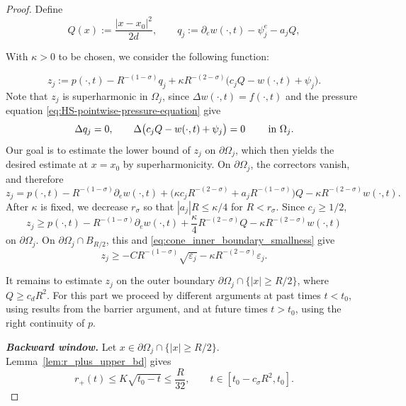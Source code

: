 \documentclass[11pt]{amsart}
\numberwithin{equation}{section}
\numberwithin{figure}{section}
\theoremstyle{plain}
\theoremstyle{definition}
\theoremstyle{remark}
\theoremstyle{plain}
\begin{document}
\begin{proof}
Define
\[
    Q(x):=\frac{|x-x_0|^2}{2d},
    \qquad
    q_j:=\partial_e w(\cdot,t)-\psi_j^e-a_jQ,
\]

With \(\kappa>0\) to be chosen,
we consider the following function:

\begin{equation}\label{eq:cone_barrier}
    z_j:=p(\cdot,t)-R^{-(1-\sigma)}q_j
    +\kappa R^{-(2-\sigma)}\bigl(c_jQ-w(\cdot,t)+\psi_j\bigr).
\end{equation}
Note that $z_j$ is superharmonic in $\Omega_j$, since  \(\Delta w(\cdot,t)=f(\cdot,t)\) and
the pressure equation \eqref{eq:HS-pointwise-pressure-equation}
give
\[
    \Delta q_j=0,
    \qquad
    \Delta\bigl(c_jQ-w(\cdot,t)+\psi_j\bigr)=0 \qquad \hbox{ in } \Omega_j.
\]
Our goal is to estimate the lower bound of $z_j$ on $\partial\Omega_j$, which then yields the desired estimate at $x=x_0$ by superharmonicity.
On \(\partial\Omega_j\), the correctors vanish, and therefore
\[
    z_j=p(\cdot,t)-R^{-(1-\sigma)}\partial_e w(\cdot,t)
    +\bigl(\kappa c_jR^{-(2-\sigma)}+a_jR^{-(1-\sigma)}\bigr)Q
    -\kappa R^{-(2-\sigma)}w(\cdot,t).
\]
After \(\kappa\) is fixed, we decrease \(r_\sigma\) so that
\(|a_j|R\leq\kappa/4\) for \(R<r_\sigma\). Since \(c_j\geq1/2\),
\begin{equation}\label{eq:cone_boundary_common}
    z_j\geq p(\cdot,t)-R^{-(1-\sigma)}\partial_e w(\cdot,t)
    +\frac{\kappa}{4}R^{-(2-\sigma)}Q
    -\kappa R^{-(2-\sigma)}w(\cdot,t)
\end{equation}
on \(\partial\Omega_j\). On \(\partial\Omega_j\cap B_{R/2}\), this and
\eqref{eq:cone_inner_boundary_smallness} give
\begin{equation}\label{eq:cone_inner_boundary_zj}
    z_j\geq
    -CR^{-(1-\sigma)}\sqrt{\varepsilon_j}
    -\kappa R^{-(2-\sigma)}\varepsilon_j.
\end{equation}

It remains to estimate \(z_j\) on the outer boundary 
\(\partial\Omega_j\cap\{|x|\geq R/2\}\), where $Q\geq c_dR^2$. For this part we proceed by different arguments at past times $t<t_0$, using results from the barrier argument, and at future times $t>t_0$, using the right continuity of $p$. 


\textbf{\emph{Backward window.}}
Let $x\in \partial\Omega_j\cap \{|x|\geq R/2\}$.
Lemma~\ref{lem:r_plus_upper_bd} gives
\begin{equation}\label{eq:cone_r_plus_small_on_window}
    r_+(t)\leq K\sqrt{t_0-t}\leq \frac{R}{32},
    \qquad t\in[t_0-c_\sigma R^2,t_0].
\end{equation}


\end{proof}
\end{document}
